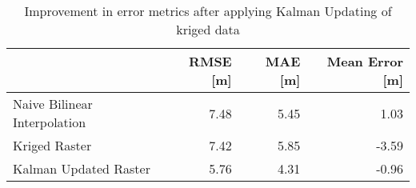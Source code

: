 \begin{table}
\centering
\caption{Improvement in error metrics after applying Kalman Updating of kriged data}
\label{tab:charlotteamalie_gebco_raster_error}
\begin{tabular}{lrrr}
\toprule
 & RMSE [m] & MAE [m] & Mean Error [m] \\
\midrule
Naive Bilinear Interpolation & 7.48 & 5.45 & 1.03 \\
Kriged Raster & 7.42 & 5.85 & -3.59 \\
Kalman Updated Raster & 5.76 & 4.31 & -0.96 \\
\bottomrule
\end{tabular}
\end{table}
